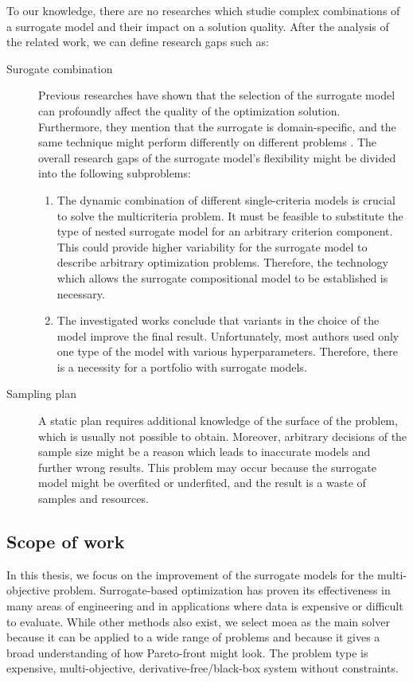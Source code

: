         To our knowledge, there are no researches which studie complex combinations of a surrogate model and their impact on a solution quality. After the analysis of the related work, we can define research gaps such as:
        \begin{description}
            \item[Surogate combination] Previous researches have shown that the selection of the surrogate model can profoundly affect the quality of the optimization solution. Furthermore, they mention that the surrogate is domain-specific, and the same technique might perform differently on different problems \cite{LuST19, HybridSurrRCG}. The overall research gaps of the surrogate model's flexibility might be divided into the following subproblems:
            \begin{enumerate}
                \item The dynamic combination of different single-criteria models is crucial to solve the multicriteria problem. It must be feasible to substitute the type of nested surrogate model for an arbitrary criterion component. This could provide higher variability for the surrogate model to describe arbitrary optimization problems. Therefore, the technology which allows the surrogate compositional model to be established is necessary.
                \item The investigated works conclude that variants in the choice of the model improve the final result. Unfortunately, most authors used only one type of the model with various hyperparameters. Therefore, there is a necessity for a portfolio with surrogate models.
            \end{enumerate}
            \item[Sampling plan] A static plan requires additional knowledge of the surface of the problem, which is usually not possible to obtain. Moreover, arbitrary decisions of the sample size might be a reason which leads to inaccurate models and further wrong results. This problem may occur because the surrogate model might be overfited or underfited, and the result is a waste of samples and resources. 
        \end{description}

        \subsection{Scope of work}
        In this thesis, we focus on the improvement of the surrogate models for the multi-objective problem. Surrogate-based optimization has proven its effectiveness in many areas of engineering and in applications where data is expensive or difficult to evaluate. While other methods also exist, we select \gls{moea} as the main solver because it can be applied to a wide range of problems and because it gives a broad understanding of how Pareto-front might look. The problem type is expensive, multi-objective, derivative-free/black-box system without constraints.

